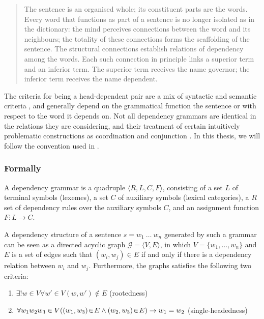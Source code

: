\documentclass{report}
\theoremstyle{definition}
\theoremstyle{plain}
\begin{document}
\begin{quote}
The sentence is an organised whole; its constituent parts are the words. Every word that functions as part of a sentence is no longer isolated as in the dictionary: the mind perceives connections between the word and its neighbours; the totality of these connections forms the scaffolding of the sentence. The structural connections establish relations of dependency among the words. Each such connection in principle links a superior term and an inferior term. The superior term receives the name governor; the inferior term receives the name dependent. \citep[Translation:][]{ryan2013}
\end{quote}

The criteria for being a head-dependent pair are a mix of syntactic and semantic criteria \citep{nivre2005dependency}, and generally depend on the grammatical function the sentence or with respect to the word it depends on. Not all dependency grammars are identical in the relations they are considering, and their treatment of certain intuitively problematic constructions as coordination and conjunction \citep{nivre2005dependency}. In this thesis, we will follow the convention used in \cite{de2006generating}.

\subsubsection{Formally}

A dependency grammar is a quadruple $\langle R,L,C,F\rangle$, consisting of a set $L$ of terminal symbols (lexemes), a set $C$ of auxiliary symbols (lexical categories), a $R$ set of dependency rules over the auxiliary symbols $C$, and an assignment function $F : L\rightarrow C$.\citep{hays1964dependency,gaifman1965dependency}

A dependency structure of a sentence $s = w_1~\ldots~w_n$ generated by such a grammar can be seen as a directed acyclic graph $\mathcal{G} = \langle V, E\rangle$, in which $V = \{w_1, \ldots,w_n\}$ and $E$ is a set of edges such that $(w_i,w_j)\in E$ if and only if there is a dependency relation between $w_i$ and $w_j$. Furthermore, the graphs satisfies the following two criteria:
\begin{enumerate}
\item $\exists! w\in V \forall w'\in V (w,w')\notin E$ (rootedness)
\item $\forall w_1 w_2 w_3 \in V( (w_1,w_3)\negthinspace\in\negthinspace E \land (w_2,w_3)\negthinspace \in\negthinspace E ) \rightarrow w_1 = w_2$ (single-headedness)
\end{enumerate} 
\end{document}
